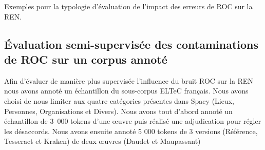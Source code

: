 \begin{table}[h!]
    \centering
    

    \caption{Exemples pour la typologie d'évaluation de l'impact des erreurs de ROC sur la REN.}
    \label{tab:typo_eval}
\end{table}




%    
%



\subsection{\'Evaluation semi-supervisée des contaminations de ROC sur un corpus annoté}

Afin d'évaluer de manière plus supervisée l'influence du bruit ROC sur la REN nous avons annoté un échantillon du sous-corpus ELTeC français.
 Nous avons choisi de nous limiter aux quatre catégories présentes dans Spacy (Lieux, Personnes, Organisations et Divers).
  Nous avons tout d'abord annoté un échantillon de 3~000 tokens d'une œuvre  puis réalisé une adjudication pour régler les désaccords. 
  Nous avons ensuite annoté 5 000 tokens de 3 versions (Référence, Tesseract et Kraken) de deux œuvres (Daudet et Maupassant)

